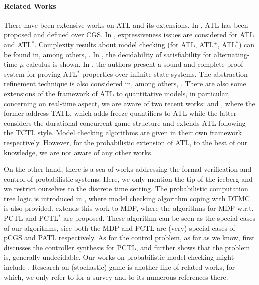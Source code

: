 \documentclass[times, 10 pt,twocolumn]{article}
\begin{document}
\paragraph{Related Works}
There have been extensive works on ATL and its extensions. In
\cite{AHK02}, ATL has been proposed and defined over CGS. In
\cite{HRS02, LMO07}, expressiveness issues are considered for ATL
and ATL$^*$. Complexity results about model checking (for ATL,
ATL$^+$, ATL$^*$) can be found in, among others, \cite{AHK02,
Sch04, LMO07}. %
In \cite{SF06}, the decidability of satisfiability for
alternating-time $\mu$-calculus is shown. In \cite{SSM06}, the
authors present a sound and complete proof system for proving
ATL$^*$ properties over infinite-state systems. The
abstraction-refinement technique is also considered in, among
others, \cite{BK06}. There are also some extensions of the
framework of ATL to quantitative models, in particular, concerning
on real-time aspect, we are aware of two recent works: \cite{HP06}
and \cite{LMO06}, where the former address TATL, which adds freeze
quantifiers to ATL while the latter considers the durational
concurrent game structure and extends ATL following the TCTL
style. Model checking algorithms are given in their own framework
respectively. However, for the probabilistic extension of ATL, to
the best of our knowledge, we are not aware of any other works.

On the other hand, there is a sea of works addressing the formal
verification and control of probabilistic systems. Here, we only
mention the tip of the iceberg and we restrict ourselves to the
discrete time setting. The probabilistic computation tree logic is
introduced in \cite{HJ94}, where model checking algorithm coping
with DTMC is also provided. \cite{BdeA95} extends this work to
MDP, where the algorithms for MDP w.r.t. PCTL and PCTL$^*$ are
proposed. These algorithm can be seen as the special cases of our
algorithms, sice both the MDP and PCTL are (very) special cases of
pCGS and PATL respectively. As for the control problem, as far as
we know, \cite{BGLBC04} first discusses the controller synthesis
for PCTL, and \cite{BBFK06} further shows that the problem is,
generally undecidable. Our works on probabilistic model checking
might include \cite{CY95}. Research on (stochastic) game is
another line of related works, for which, we only refer to
\cite{Wal04} for a survey and
to its numerous references there. %
\end{document}
